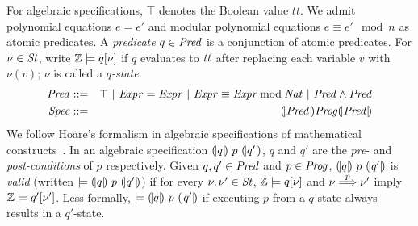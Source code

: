 For algebraic specifications, $\top$ denotes the Boolean value
$\mathit{tt}$. We admit polynomial equations $e = e'$ and modular
polynomial equations $e \equiv e' \mod n$ as atomic predicates.
A \emph{predicate} $q \in \mathit{Pred}$ is a conjunction of atomic
predicates. For 
$\nu \in \mathit{St}$, write $\mathbb{Z} \models q[\nu]$ if $q$
evaluates to $\mathit{tt}$ after replacing each variable $v$ with
$\nu(v)$; $\nu$ is called a \emph{$q$-state}.
\begin{eqnarray*}
  \mathit{Pred} & ::= & \top
     \ |\   \mathit{Expr} = \mathit{Expr}
     \ |\   \mathit{Expr} \equiv \mathit{Expr} \mathbin{\textmd{mod}} \mathit{Nat}
     \ |\   \mathit{Pred} \wedge \mathit{Pred}\\
  \mathit{Spec} & ::= & {(\!|}{\mathit{Pred}}{|\!)} \mathit{Prog} {(\!|}{\mathit{Pred}}{|\!)}
\end{eqnarray*}
We follow Hoare's formalism in algebraic specifications of
mathematical constructs~\cite{H:69:ABCP}. In an algebraic
specification ${(\!|}{q}{|\!)}~{p}~{(\!|}{q'}{|\!)}$, $q$ and $q'$ are the \emph{pre}- and
\emph{post-conditions} of $p$ respectively. Given $q, q' \in \mathit{Pred}$ and $p
\in \mathit{Prog}$, ${(\!|}{q}{|\!)}~{p}~{(\!|}{q'}{|\!)}$ is \emph{valid}
(written $\models {(\!|}{q}{|\!)}~{p}~{(\!|}{q'}{|\!)}$) if for every $\nu, \nu' \in
\mathit{St}$, $\mathbb{Z} \models q[\nu]$ and $\nu \overset{p}{\Longrightarrow} \nu'$ imply
$\mathbb{Z} \models q'[\nu']$. Less formally, $\models
{(\!|}{q}{|\!)}~{p}~{(\!|}{q'}{|\!)}$ if executing $p$ from a $q$-state always
results in a $q'$-state. 
